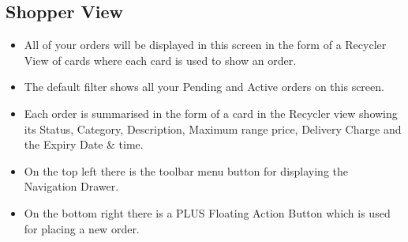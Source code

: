 \documentclass{report}
\begin{document}
\subsection{Shopper View}
\begin{itemize}
\item All of your orders will be displayed in this screen in the form of a Recycler View of cards where each card is used to show an order.
\item The default filter shows all your Pending and Active orders on this screen.
\item Each order is summarised in the form of a card in the Recycler view showing its Status, Category, Description, Maximum range price, Delivery Charge and the Expiry Date \& time.
\item On the top left there is the toolbar menu button for displaying the Navigation Drawer.
\item On the bottom right there is a PLUS Floating Action Button which is used for placing a new order.
\end{itemize}
\end{document}
